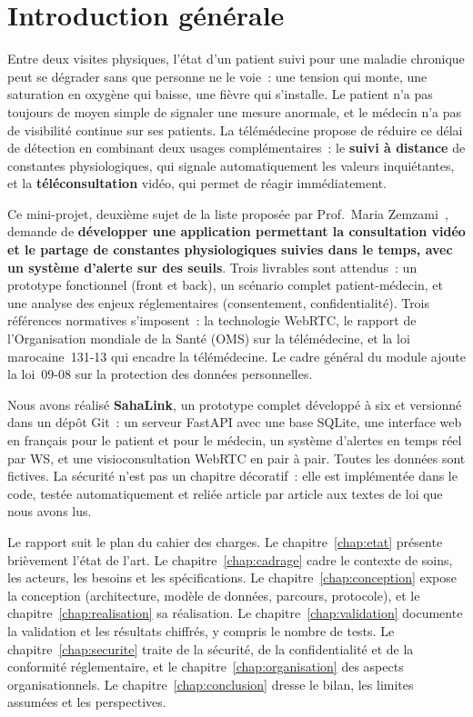 \chapter*{Introduction générale}

Entre deux visites physiques, l'état d'un patient suivi pour une maladie chronique peut se dégrader sans que personne ne le voie~: une tension qui monte, une saturation en oxygène qui baisse, une fièvre qui s'installe. Le patient n'a pas toujours de moyen simple de signaler une mesure anormale, et le médecin n'a pas de visibilité continue sur ses patients. La télémédecine propose de réduire ce délai de détection en combinant deux usages complémentaires~: le \textbf{suivi à distance} de constantes physiologiques, qui signale automatiquement les valeurs inquiétantes, et la \textbf{téléconsultation} vidéo, qui permet de réagir immédiatement.

Ce mini-projet, deuxième sujet de la liste proposée par Prof.~Maria Zemzami~\cite{zemzami2026}, demande de \textbf{développer une application permettant la consultation vidéo et le partage de constantes physiologiques suivies dans le temps, avec un système d'alerte sur des seuils}. Trois livrables sont attendus~: un prototype fonctionnel (front et back), un scénario complet patient-médecin, et une analyse des enjeux réglementaires (consentement, confidentialité). Trois références normatives s'imposent~: la technologie WebRTC, le rapport de l'Organisation mondiale de la Santé (\ac{OMS}) sur la télémédecine, et la loi marocaine~131-13 qui encadre la télémédecine. Le cadre général du module ajoute la loi~09-08 sur la protection des données personnelles.

Nous avons réalisé \textbf{SahaLink}, un prototype complet développé à six et versionné dans un dépôt Git~: un serveur FastAPI avec une base SQLite, une interface web en français pour le patient et pour le médecin, un système d'alertes en temps réel par \ac{WS}, et une visioconsultation WebRTC en pair à pair. Toutes les données sont fictives. La sécurité n'est pas un chapitre décoratif~: elle est implémentée dans le code, testée automatiquement et reliée article par article aux textes de loi que nous avons lus.

Le rapport suit le plan du cahier des charges. Le chapitre~\ref{chap:etat} présente brièvement l'état de l'art. Le chapitre~\ref{chap:cadrage} cadre le contexte de soins, les acteurs, les besoins et les spécifications. Le chapitre~\ref{chap:conception} expose la conception (architecture, modèle de données, parcours, protocole), et le chapitre~\ref{chap:realisation} sa réalisation. Le chapitre~\ref{chap:validation} documente la validation et les résultats chiffrés, y compris le nombre de tests. Le chapitre~\ref{chap:securite} traite de la sécurité, de la confidentialité et de la conformité réglementaire, et le chapitre~\ref{chap:organisation} des aspects organisationnels. Le chapitre~\ref{chap:conclusion} dresse le bilan, les limites assumées et les perspectives.
